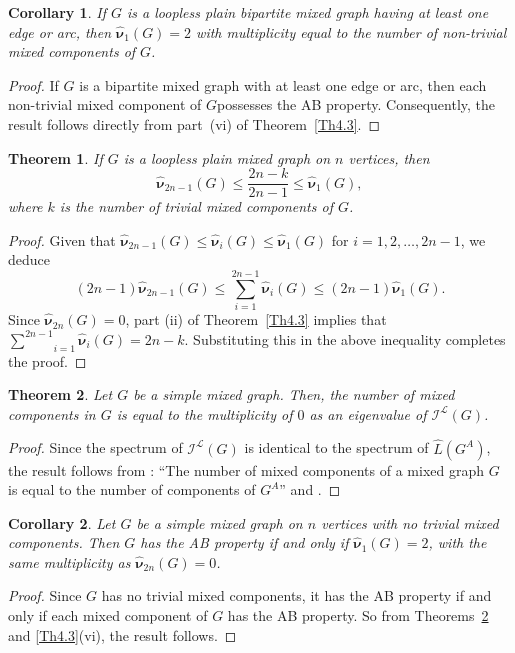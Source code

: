 \documentclass[12pt]{article}
\numberwithin{equation}{section}
\newtheorem{thm}{Theorem}[section]
\newtheorem{cor}{Corollary}[section]
\begin{document}
	\begin{cor}
		If $G$ is a loopless plain bipartite mixed graph having at least one edge or arc, then $\hat{\bm{\nu}}_1(G)=2$ with multiplicity equal to the number of non-trivial mixed components of $G$.
	\end{cor}
	\begin{proof}
		If $G$ is a bipartite mixed graph with at least one edge or arc, then each non-trivial mixed component of $G$possesses the AB property. Consequently, the result follows directly from part~(vi) of Theorem~\ref{Th4.3}.
	\end{proof}
	\begin{thm}
	If $G$ is a loopless plain mixed graph on $n$ vertices, then
		$$\hat{\bm{\nu}}_{2n-1}(G)\leq\frac{2n-k}{2n-1}\leq\hat{\bm{\nu}}_{1}(G),$$ where $k$ is the number of trivial mixed components of $G$.
	\end{thm}
	\begin{proof}
	Given that  $\hat{\bm{\nu}}_{2n-1}(G)\leq\hat{\bm{\nu}}_i(G)\leq\hat{\bm{\nu}}_1(G)$ for $i=1,2,\ldots,2n-1$, we deduce $$(2n-1)\hat{\bm{\nu}}_{2n-1}(G)\leq\underset{i=1}{\overset{2n-1}{\sum}}\hat{\bm{\nu}}_i(G)\leq(2n-1)\hat{\bm{\nu}}_1(G).$$
		Since $\hat{\bm{\nu}}_{2n}(G)=0$, part (ii) of Theorem~\ref{Th4.3} implies that $\underset{i=1}{\overset{2n-1}{\sum}}\hat{\bm{\nu}}_i(G)=2n-k$. 
	Substituting this in the above inequality completes the proof.
	\end{proof}
	\begin{thm}\label{Th4.4}
		Let $ G $ be a simple mixed graph. Then, the number of mixed components in $ G $ is equal to the multiplicity of $ 0 $ as an eigenvalue of $ \mathcal{I}^\mathcal{L}(G) $.
	\end{thm}
	\begin{proof}
		Since the spectrum of $\mathcal{I}^\mathcal{L}(G)$ is identical to the spectrum of $\widehat{L}(G^A)$, the result follows from \cite[Corollary~6.1]{Kalaimatrices1}: ``The number of mixed components of a mixed graph $G$ is equal to the number of components of $G^A$'' and \cite[Theorem~7.7.3]{cvetkovic}. 
	\end{proof}
	
	\begin{cor}
		Let $G$ be a simple mixed graph on $n$ vertices with  no trivial mixed components. Then $G$ has the AB property if and only if $\hat{\bm{\nu}}_1(G)=2$, with the same multiplicity as $\hat{\bm{\nu}}_{2n}(G)=0$.
	\end{cor}
	\begin{proof}
		Since $G$ has no trivial mixed components, it has the AB property if and only if each mixed component of $G$ has the AB property.
		So from Theorems~\ref{Th4.4} and \ref{Th4.3}(vi), the result follows.
	\end{proof}
	
\end{document}
